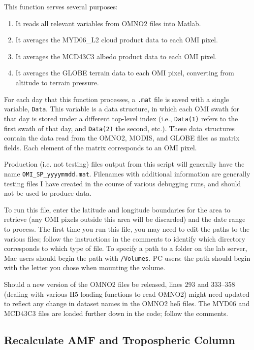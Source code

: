 \documentclass[12pt]{article}
\begin{document}
	 This function serves several purposes: 
		\begin{enumerate}
 		 \item It reads all relevant variables from OMNO2 files into Matlab.
		 \item It averages the MYD06\_L2 cloud product data to each OMI pixel.
		 \item It averages the MCD43C3 albedo product data to each OMI pixel.
		 \item It averages the GLOBE terrain data to each OMI pixel, converting from altitude to terrain pressure.
		\end{enumerate}
	For each day that this function processes, a {\lstinline[breaklines=true]|.mat|} file is saved with a single variable, {\lstinline[breaklines=true]|Data|}.  This variable is a data structure, in which each OMI swath for that day is stored under a different top-level index (i.e., {\lstinline[breaklines=true]|Data(1)|} refers to the first swath of that day, and {\lstinline[breaklines=true]|Data(2)|} the second, etc.).  These data structures contain the data read from the OMNO2, MODIS, and GLOBE files as matrix fields.  Each element of the matrix corresponds to an OMI pixel.
	
	Production (i.e. not testing) files output from this script will generally have the name {\lstinline[breaklines=true]|OMI_SP_yyyymmdd.mat|}.  Filenames with additional information are generally testing files I have created in the course of various debugging runs, and should not be used to produce  data.
	
	To run this file, enter the latitude and longitude boundaries for the area to retrieve (any OMI pixels outside this area will be discarded) and the date range to process.  The first time you run this file, you may need to edit the paths to the various files; follow the instructions in the comments to identify which directory corresponds to which type of file.  To specify a path to a folder on the lab server, Mac users should begin the path with {\lstinline[breaklines=true]|/Volumes|}.  PC users: the path should begin with the letter you chose when mounting the volume.
	
	Should a new version of the OMNO2 files be released, lines 293 and 333--358 (dealing with various H5 loading functions to read OMNO2) might need updated to reflect any change in dataset names in the OMNO2 he5 files.  The MYD06 and MCD43C3 files are loaded further down in the code; follow the comments. 
	
	\subsection{Recalculate AMF and Tropospheric Column}
	
\end{document}
